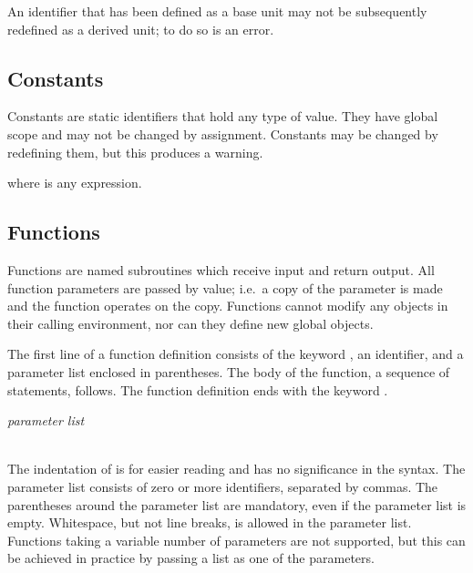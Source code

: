 An identifier that has been defined as a base unit may not be
subsequently redefined as a derived unit; to do so is an error.



\subsection{Constants}
\label{constants}

Constants are static identifiers that hold any type of value.  They
have global scope and may not be changed by assignment.  Constants may
be changed by redefining them, but this produces a warning.

\begin{syntax}
 \id{} \key{=} \expr{}
\end{syntax}
where \expr{} is any expression.


\subsection{Functions}
\label{functions}

Functions are named subroutines which receive input and return output.
All function parameters are passed by value; i.e.\ a copy of the
parameter is made and the function operates on the copy.  Functions
cannot modify any objects in their calling environment, nor can they
define new global objects.

The first line of a function definition consists of the keyword
, an identifier, and a parameter list enclosed in
parentheses.  The body of the function, a sequence of statements,
follows.  The function definition ends with the keyword .

\begin{syntax}
 \id{}\key{(} \textit{parameter list} \key{)}\\
\codeindent\statements{} \\
\end{syntax}

The indentation of \statements{} is for easier reading and has no
significance in the syntax.  The parameter list consists of zero or
more identifiers, separated by commas.  The parentheses around the
parameter list are mandatory, even if the parameter list is empty.
Whitespace, but not line breaks, is allowed in the parameter list.
Functions taking a variable number of parameters are not supported,
but this can be achieved in practice by passing a list as one of the
parameters.

